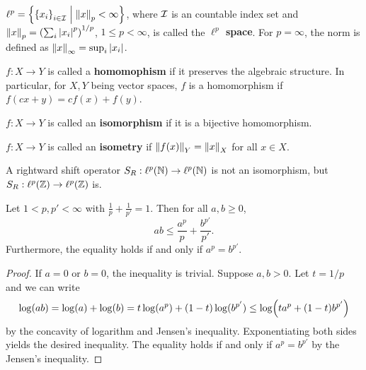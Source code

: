 \begin{definition}
    $\ell^p = \left\{ \left\{ {x_i} \right\}_{i\in\mathcal{I}} \;\middle\vert\; \left\lVert {x} \right\rVert_p < \infty \right\}$, where 
    $\mathcal{I}$ is an countable index set and $\norm{x}_p = 
    \pth{\sum_i \abs{x_i}^p}^{1/p}$, $1\leq p <\infty$,  
    is called the \textbf{$\ell^p$ space}. For $p=\infty$, 
    the norm is defined as $\left\lVert {x} \right\rVert_\infty = \sup_i\left\lvert {x_i} \right\rvert$.
\end{definition}

\begin{definition}
    $f:X\to Y$ is called a \textbf{homomophism} if it preserves 
    the algebraic structure. In particular, for $X,Y$ being 
    vector spaces, $f$ is a homomorphism if $f(cx+y) = cf(x)+f(y)$.
\end{definition}

\begin{definition}
    $f:X\to Y$ is called an \textbf{isomorphism} if it is a 
    bijective homomorphism.
\end{definition}

\begin{definition}
    $f:X\to Y$ is called an \textbf{isometry} if $\left\lVert {f(x)} \right\rVert_Y 
    = \left\lVert {x} \right\rVert_X$ for all $x\in X$.
\end{definition}

\begin{example}
    A rightward shift operator $S_R:\ell^p(\mathbb{N})\to\ell^p(\mathbb{N})$ is 
    not an isomorphism, but $S_R:\ell^p(\mathbb{Z})\to\ell^p(\mathbb{Z})$ is.
\end{example}

\begin{lemma}
    Let $1< p,p'<\infty$ with $\frac{1}{p}+\frac{1}{p'}=1$. 
    Then for all $a,b\geq 0$, 
    \begin{equation*}
        ab \leq \frac{a^p}{p} + \frac{b^{p'}}{p'}.
    \end{equation*}
    Furthermore, the equality holds if and only if $a^p = b^{p'}$.
\end{lemma}
\begin{proof}
    If $a = 0$ or $b = 0$, the inequality is trivial. Suppose 
    $a,b>0$. Let $t = 1/p$ and we can write 
    \begin{equation*}
        \log(ab) = \log(a) + \log(b) = t\log(a^p) + (1-t)\log(b^{p'}) 
        \leq \log\pth{ta^p + (1-t)b^{p'}}
    \end{equation*} 
    by the concavity of logarithm and Jensen's inequality.
    Exponentiating both sides yields the desired inequality. 
    The equality holds if and only if $a^p = b^{p'}$ by the 
    Jensen's inequality.
\end{proof}

